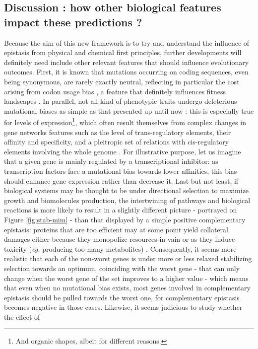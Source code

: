 \subsection{Discussion : how other biological features impact these predictions ?}


Because the aim of this new framework is to try and understand the influence of epistasis from physical and chemical first principles, further developments will definitely need include other relevant features that should influence evolutionary outcomes. First, it is known that mutations occurring on coding sequences, even being synonymous, are rarely exactly neutral, reflecting in particular the cost arising from codon usage bias \citep{Ikemura85,Galtier18,laBella19}, a feature that definitely influences fitness landscapes \citep{Fragata18}. In parallel, not all kind of phenotypic traits undergo deleterious mutational biases as simple as that presented up until now : this is especially true for levels of expression\footnote{And organic shapes, albeit for different reasons.},  which often result themselves from complex changes in gene networks features such as the level of trans-regulatory elements, their affinity and specificity, and a pleitropic set of relations with cis-regulatory elements involving the whole genome \citep{Hodgkin98,Chesmore16,Boyle17,Sella19}. For illustrative purpose, let us imagine that a given gene is mainly regulated by a transcriptional inhibitor: as transcription factors face a mutational bias towards lower affinities, this bias should enhance gene expression rather than decrease it. Last but not least, if biological systems may be thought to be under directional selection to maximize growth and biomolecules production, the intertwining of pathways and biological reactions is more likely to result in a slightly different picture - portrayed on Figure \ref{fig:stab-mim} - than that displayed by a simple positive complementary epistasis: proteins that are too efficient may at some point yield collateral damages either because they monopolize resources in vain or as they induce toxicity (\textit{eg.} producing too many metabolites) \citep{Lilja17,Niehaus20,Labourel21}. Consequently, it seems more realistic that each of the non-worst genes is under more or less relaxed stabilizing selection towards an optimum, coinciding with the worst gene  -  that can only change when the worst gene of the set improves to a higher value - which means that even when no mutational bias exists, most genes involved in complementary epistasis should be pulled towards the worst one, for complementary epistasis becomes negative in those cases. Likewise, it seems judicious to study whether the effect of 